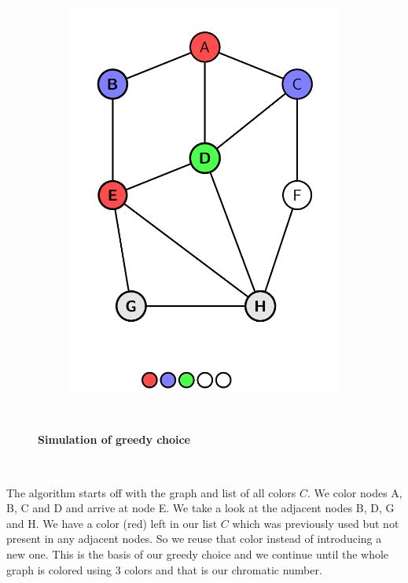 \documentclass[14pt]{extreport}
\begin{document}
\begin{figure}[h]
\begin{subfigure}[t]{0.45\textwidth}
                \includegraphics[width=0.9\linewidth]{diagrams/greedy-2.png}
                \subcaption{}
            \end{subfigure}
            \caption{\textbf{Simulation of greedy choice}}\
            \label{fig:1}
        \end{figure}\
        
        The algorithm starts off with the graph and list of all colors $C$. We color nodes A, B, C and D and arrive at node E. We take a look at the adjacent nodes B, D, G and H. We have a color (red) left in our list $C$ which was previously used but not present in any adjacent nodes. So we reuse that color instead of introducing a new one. This is the basis of our greedy choice and we continue until the whole graph is colored using 3 colors and that is our chromatic number.
        
        \pagebreak
    	
\end{document}
